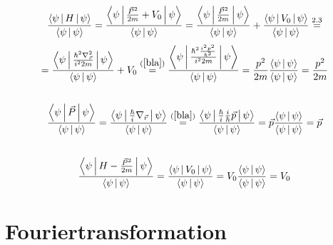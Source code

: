 \documentclass[a4paper,11pt]{article}
\begin{document}
\subsection{}
\begin{equation}
        \frac{\Braket{\psi|H|\psi}}{\Braket{\psi|\psi}} = \frac{\Braket{\psi|\frac{\vec{P}^2}{2m} + V_0|\psi}}{\Braket{\psi|\psi}} = \frac{\Braket{\psi|\frac{\vec{P}^2}{2m}|\psi}}{\Braket{\psi|\psi}} + \frac{\Braket{\psi|V_0|\psi}}{\Braket{\psi|\psi}} \overset{2.3}{=}
\end{equation}
\begin{equation}
        = \frac{\Braket{\psi|\frac{\hbar^2\nabla^2_{\vec{r}}}{i^22m}|\psi}}{\Braket{\psi|\psi}} + V_0 \overset{(\ref{bla})}{=} \frac{\Braket{\psi|\frac{\hbar^2\frac{i^2p^2}{\hbar^2}}{i^22m}|\psi}}{\Braket{\psi|\psi}} = \frac{p^2}{2m}\frac{\Braket{\psi|\psi}}{\Braket{\psi|\psi}} = \frac{p^2}{2m}
\end{equation}

\subsection{}
\begin{equation}
        \frac{\Braket{\psi|\vec{P}|\psi}}{\Braket{\psi|\psi}} = \frac{\Braket{\psi|\frac{\hbar}{i}\nabla_{\vec{r}}|\psi}}{\Braket{\psi|\psi}} \overset{(\ref{bla})}{=} \frac{\Braket{\psi|\frac{\hbar}{i}\frac{i}{\hbar}\vec{p}|\psi}}{\Braket{\psi|\psi}} = \vec{p}\frac{\Braket{\psi|\psi}}{\Braket{\psi|\psi}} = \vec{p}
\end{equation}

\subsection{}
\begin{equation}
        \frac{\Braket{\psi|H - \frac{\vec{P}^2}{2m}|\psi}}{\Braket{\psi|\psi}} = \frac{\Braket{\psi|V_0|\psi}}{\Braket{\psi|\psi}} = V_0\frac{\Braket{\psi|\psi}}{\Braket{\psi|\psi}} = V_0
\end{equation}

\section{Fouriertransformation}

\subsection{}
\end{document}
